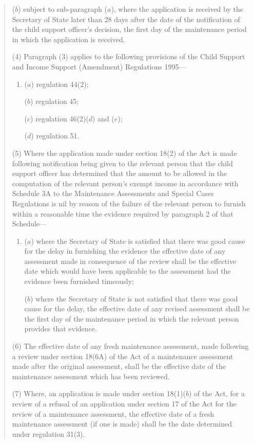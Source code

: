 \documentclass[12pt,a4paper]{article}
\begin{document}
\begin{quotation}
\begin{enumerate}
($b$) subject to sub-paragraph ($a$), where the application is received by the Secretary of State later than 28 days after the date of the notification of the child support officer’s decision, the first day of the maintenance period in which the application is received.
\end{enumerate}

(4) Paragraph (3) applies to the following provisions of the Child Support and Income Support (Amendment) Regulations 1995—
\begin{enumerate}\item[]
($a$) regulation 44(2);

($b$) regulation 45;

($c$) regulation 46(2)($d$) and ($e$);

($d$) regulation 51.
\end{enumerate}

(5) Where the application made under section 18(2) of the Act is made following notification being given to the relevant person that the child support officer has determined that the amount to be allowed in the computation of the relevant person’s exempt income in accordance with Schedule 3A to the Maintenance Assessments and Special Cases Regulations is nil by reason of the failure of the relevant person to furnish within a reasonable time the evidence required by paragraph 2 of that Schedule—
\begin{enumerate}\item[]
($a$) where the Secretary of State is satisfied that there was good cause for the delay in furnishing the evidence the effective date of any assessment made in consequence of the review shall be the effective date which would have been applicable to the assessment had the evidence been furnished timeously;

($b$) where the Secretary of State is not satisfied that there was good cause for the delay, the effective date of any revised assessment shall be the first day of the maintenance period in which the relevant person provides that evidence.
\end{enumerate}

(6) The effective date of any fresh maintenance assessment, made following a review under section 18(6A) of the Act of a maintenance assessment made after the original assessment, shall be the effective date of the maintenance assessment which has been reviewed.

(7) Where, an application is made under section 18(1)($b$) of the Act, for a review of a refusal of an application under section 17 of the Act for the review of a maintenance assessment, the effective date of a fresh maintenance assessment (if one is made) shall be the date determined under regulation 31(3).


\end{quotation}
\end{document}
